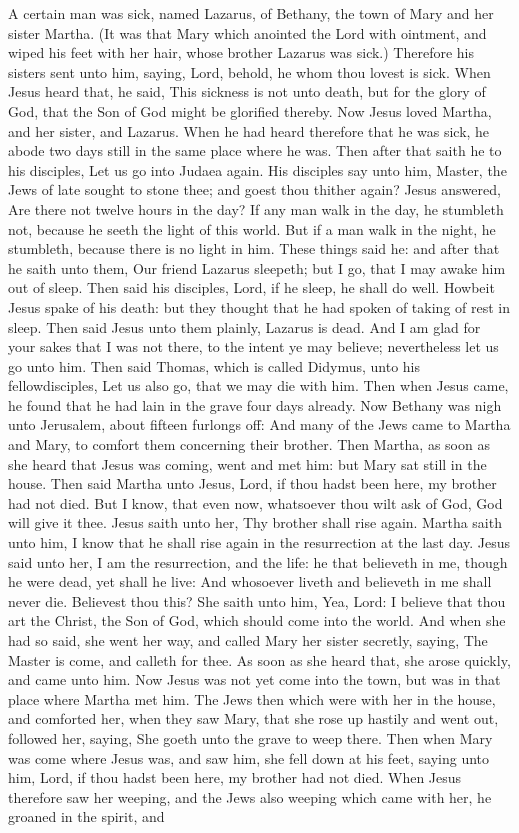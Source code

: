  A certain man was sick, named Lazarus, of Bethany, the town of Mary and her sister Martha. (It was that Mary which anointed the Lord with ointment, and wiped his feet with her hair, whose brother Lazarus was sick.) Therefore his sisters sent unto him, saying, Lord, behold, he whom thou lovest is sick. When Jesus heard that, he said, This sickness is not unto death, but for the glory of God, that the Son of God might be glorified thereby. Now Jesus loved Martha, and her sister, and Lazarus. When he had heard therefore that he was sick, he abode two days still in the same place where he was. Then after that saith he to his disciples, Let us go into Judaea again. His disciples say unto him, Master, the Jews of late sought to stone thee; and goest thou thither again? Jesus answered, Are there not twelve hours in the day? If any man walk in the day, he stumbleth not, because he seeth the light of this world. But if a man walk in the night, he stumbleth, because there is no light in him. These things said he: and after that he saith unto them, Our friend Lazarus sleepeth; but I go, that I may awake him out of sleep. Then said his disciples, Lord, if he sleep, he shall do well. Howbeit Jesus spake of his death: but they thought that he had spoken of taking of rest in sleep. Then said Jesus unto them plainly, Lazarus is dead. And I am glad for your sakes that I was not there, to the intent ye may believe; nevertheless let us go unto him. Then said Thomas, which is called Didymus, unto his fellowdisciples, Let us also go, that we may die with him. Then when Jesus came, he found that he had lain in the grave four days already. Now Bethany was nigh unto Jerusalem, about fifteen furlongs off: And many of the Jews came to Martha and Mary, to comfort them concerning their brother. Then Martha, as soon as she heard that Jesus was coming, went and met him: but Mary sat still in the house. Then said Martha unto Jesus, Lord, if thou hadst been here, my brother had not died. But I know, that even now, whatsoever thou wilt ask of God, God will give it thee. Jesus saith unto her, Thy brother shall rise again. Martha saith unto him, I know that he shall rise again in the resurrection at the last day. Jesus said unto her, I am the resurrection, and the life: he that believeth in me, though he were dead, yet shall he live: And whosoever liveth and believeth in me shall never die. Believest thou this? She saith unto him, Yea, Lord: I believe that thou art the Christ, the Son of God, which should come into the world. And when she had so said, she went her way, and called Mary her sister secretly, saying, The Master is come, and calleth for thee. As soon as she heard that, she arose quickly, and came unto him. Now Jesus was not yet come into the town, but was in that place where Martha met him. The Jews then which were with her in the house, and comforted her, when they saw Mary, that she rose up hastily and went out, followed her, saying, She goeth unto the grave to weep there. Then when Mary was come where Jesus was, and saw him, she fell down at his feet, saying unto him, Lord, if thou hadst been here, my brother had not died. When Jesus therefore saw her weeping, and the Jews also weeping which came with her, he groaned in the spirit, and 